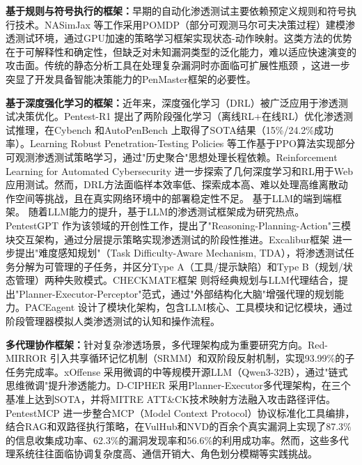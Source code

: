 \documentclass[a4paper, twocolumn]{article}
\begin{document}
\textbf{基于规则与符号执行的框架：}早期的自动化渗透测试主要依赖预定义规则和符号执行技术。NASimJax \cite{simon2026nasimjax} 等工作采用POMDP（部分可观测马尔可夫决策过程）建模渗透测试环境，通过GPU加速的策略学习框架实现状态-动作映射。这类方法的优势在于可解释性和确定性，但缺乏对未知漏洞类型的泛化能力，难以适应快速演变的攻击面。传统的静态分析工具在处理复杂漏洞时亦面临可扩展性瓶颈 \cite{doupe2010johnny}，这进一步突显了开发具备智能决策能力的PenMaster框架的必要性。

\textbf{基于深度强化学习的框架：}近年来，深度强化学习（DRL）被广泛应用于渗透测试决策优化。Pentest-R1 \cite{kong2025pentestr1} 提出了两阶段强化学习（离线RL+在线RL）优化渗透测试推理，在Cybench \cite{shao2024cybench} 和AutoPenBench \cite{chen2024autopenbench} 上取得了SOTA结果（15\%/24.2\%成功率）。Learning Robust Penetration-Testing Policies \cite{simon2025learning} 等工作基于PPO算法实现部分可观测渗透测试策略学习，通过"历史聚合"思想处理长程依赖。Reinforcement Learning for Automated Cybersecurity \cite{zhang2025reinforcement} 进一步探索了几何深度学习和RL用于Web应用测试。然而，DRL方法面临样本效率低、探索成本高、难以处理高维离散动作空间等挑战，且在真实网络环境中的部署稳定性不足。
基于LLM的端到端框架。 随着LLM能力的提升，基于LLM的渗透测试框架成为研究热点。PentestGPT \cite{deng2023pentestgpt} 作为该领域的开创性工作，提出了"Reasoning-Planning-Action"三模块交互架构，通过分层提示策略实现渗透测试的阶段性推进。Excalibur框架 \cite{deng2026good} 进一步提出"难度感知规划"（Task Difficulty-Aware Mechanism, TDA），将渗透测试任务分解为可管理的子任务，并区分Type A（工具/提示缺陷）和Type B（规划/状态管理）两种失败模式。CHECKMATE框架 \cite{zhang2026checkmate} 则将经典规划与LLM代理结合，提出"Planner-Executor-Perceptor"范式，通过"外部结构化大脑"增强代理的规划能力。PACEagent \cite{liu2025pacebench} 设计了模块化架构，包含LLM核心、工具模块和记忆模块，通过阶段管理器模拟人类渗透测试的认知和操作流程。

\textbf{多代理协作框架：}针对复杂渗透场景，多代理架构成为重要研究方向。Red-MIRROR \cite{zhang2026redmirror} 引入共享循环记忆机制（SRMM）和双阶段反射机制，实现93.99\%的子任务完成率。xOffense \cite{zhang2025xoffense} 采用微调的中等规模开源LLM（Qwen3-32B），通过"链式思维微调"提升渗透能力。D-CIPHER \cite{liu2025dcipher} 采用Planner-Executor多代理架构，在三个基准上达到SOTA，并将MITRE ATT\&CK技术映射方法融入攻击路径评估。PentestMCP \cite{zhai2025pentestmcp} 进一步整合MCP（Model Context Protocol）协议标准化工具编排，结合RAG和双路径执行策略，在VulHub和NVD的百余个真实漏洞上实现了87.3\%的信息收集成功率、62.3\%的漏洞发现率和56.6\%的利用成功率。然而，这些多代理系统往往面临协调复杂度高、通信开销大、角色划分模糊等实践挑战。
\end{document}
